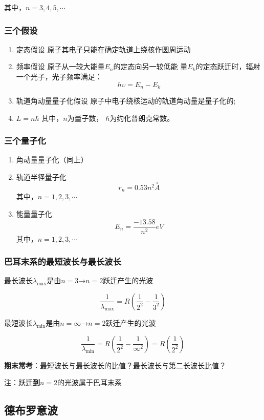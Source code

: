 \documentclass{ctexart}
\begin{document}
其中，$n=3,4,5,\cdots$

\subsubsection{三个假设}
\begin{enumerate}
	\item 定态假设
	原子其电子只能在确定轨道上绕核作圆周运动
	\item 频率假设
	原子从一较大能量$E_n$的定态向另一较低能
	量$E_k$的定态跃迁时，辐射一个光子，光子频率满足：
	$$h\upsilon=E_n-E_k$$
	\item 轨道角动量量子化假设
	原子中电子绕核运动的轨道角动量是量子化的;
	\item $L=n\hbar $
	其中，$n$为量子数，
	$\hbar$为约化普朗克常数。
\end{enumerate}


\subsubsection{三个量子化}
\begin{enumerate}
	\item 角动量量子化（同上）
	\item 轨道半径量子化
	$$r_n=0.53n^2\overset{\circ }{A}$$
	其中，$n=1,2,3,\cdots$
	\item 能量量子化
    $$E_n=\frac{-13.58}{n^2}eV$$
    其中，$n=1,2,3,\cdots$
\end{enumerate}

\subsubsection{巴耳末系的最短波长与最长波长}

最长波长$\lambda_{\max}$是由$n=3$→$n=2$跃迁产生的光波

$$\frac{1}{\lambda_{\max}}=R(\frac{1}{2^2}-\frac{1}{3^2})$$

最短波长$\lambda_{\min}$是由$n=\infty$→$n=2$跃迁产生的光波

$$\frac{1}{\lambda_{\min}}=R(\frac{1}{2^2}-\frac{1}{\infty^2})=R(\frac{1}{2^2})$$

\textbf{期末常考}：最短波长与最长波长的比值？最长波长与第二长波长比值？

注：跃迁\textbf{到}$n=2$的光波属于巴耳末系

\subsection{德布罗意波}
\end{document}
